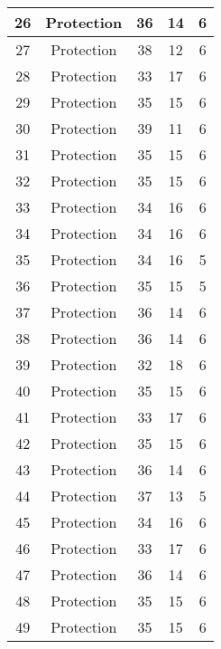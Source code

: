 \documentclass[results.tex]{subfiles}
\begin{document}
\begin{center}
\begin{tabular}{| c || c | c | c | c |}
    \hline
    26 & Protection & 36 & 14 & 6 \\ 
    \hline
    27 & Protection & 38 & 12 & 6 \\ 
    \hline
    28 & Protection & 33 & 17 & 6 \\ 
    \hline
    29 & Protection & 35 & 15 & 6 \\ 
    \hline
    30 & Protection & 39 & 11 & 6 \\ 
    \hline
    31 & Protection & 35 & 15 & 6 \\ 
    \hline
    32 & Protection & 35 & 15 & 6 \\ 
    \hline
    33 & Protection & 34 & 16 & 6 \\ 
    \hline
    34 & Protection & 34 & 16 & 6 \\ 
    \hline
    35 & Protection & 34 & 16 & 5 \\ 
    \hline
    36 & Protection & 35 & 15 & 5 \\ 
    \hline
    37 & Protection & 36 & 14 & 6 \\ 
    \hline
    38 & Protection & 36 & 14 & 6 \\ 
    \hline
    39 & Protection & 32 & 18 & 6 \\ 
    \hline
    40 & Protection & 35 & 15 & 6 \\ 
    \hline
    41 & Protection & 33 & 17 & 6 \\ 
    \hline
    42 & Protection & 35 & 15 & 6 \\ 
    \hline
    43 & Protection & 36 & 14 & 6 \\ 
    \hline
    44 & Protection & 37 & 13 & 5 \\ 
    \hline
    45 & Protection & 34 & 16 & 6 \\ 
    \hline
    46 & Protection & 33 & 17 & 6 \\ 
    \hline
    47 & Protection & 36 & 14 & 6 \\ 
    \hline
    48 & Protection & 35 & 15 & 6 \\ 
    \hline
    49 & Protection & 35 & 15 & 6 \\ 
    \hline   \end{tabular}
\end{center}
\end{document}
